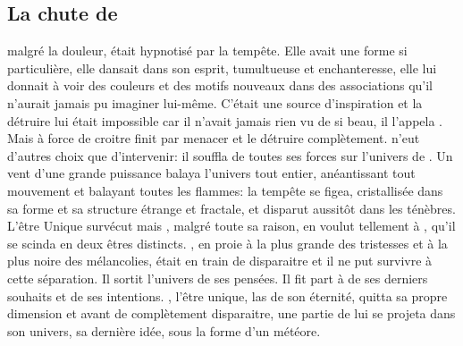    
  \subsection{La chute de \Mey}
  
  \Mey malgré la douleur, était hypnotisé par la tempête. Elle avait une forme si particulière, elle dansait dans son esprit, tumultueuse et enchanteresse, elle lui donnait à voir des couleurs et des motifs nouveaux dans des associations qu'il n'aurait jamais pu imaginer lui-même. C'était une source d'inspiration et la détruire lui était impossible car il n'avait jamais rien vu de si beau, il l'appela \Auga. Mais \Auga à force de croitre finit par menacer \Mey et le détruire complètement. \Cind n'eut d'autres choix que d'intervenir: il souffla de toutes ses forces sur l'univers de \Mey. Un vent d'une grande puissance balaya l'univers tout entier, anéantissant tout mouvement et balayant toutes les flammes: la tempête se figea, cristallisée dans sa forme et sa structure étrange et fractale, et disparut aussitôt dans les ténèbres. L'être Unique survécut mais \Mey, malgré toute sa raison, en voulut tellement à \Cind, qu'il se scinda en deux êtres distincts. \Mey, en proie à la plus grande des tristesses et à la plus noire des mélancolies, était en train de disparaitre et il ne put survivre  à cette séparation. Il sortit l'univers de ses pensées. Il fit part à \Cind de ses derniers souhaits et de ses intentions. \Mey, l'être unique, las de son éternité, quitta sa propre dimension et avant de complètement disparaitre, une partie de lui se projeta dans son univers, sa dernière idée, sous la forme d'un météore.
  
  
  
  